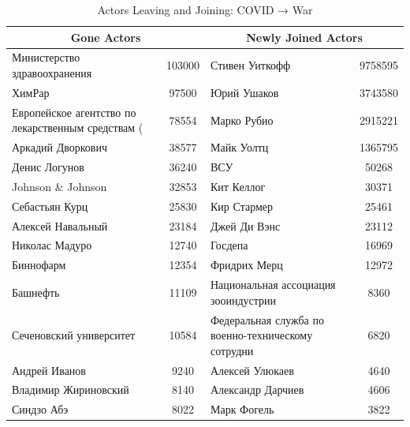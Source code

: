 \begin{table}[htbp]
\centering
\caption{Actors Leaving and Joining: COVID → War}
\label{tab:actor_changes_war}
\begin{tabular}{p{6cm}cp{6cm}c}
\toprule
\multicolumn{2}{c}{Gone Actors} & \multicolumn{2}{c}{Newly Joined Actors} \\
\midrule
Министерство здравоохранения & 103000 & Стивен Уиткофф & 9758595 \\
ХимРар & 97500 & Юрий Ушаков & 3743580 \\
Европейское агентство по лекарственным средствам ( & 78554 & Марко Рубио & 2915221 \\
Аркадий Дворкович & 38577 & Майк Уолтц & 1365795 \\
Денис Логунов & 36240 & ВСУ & 50268 \\
Johnson \& Johnson & 32853 & Кит Келлог & 30371 \\
Себастьян Курц & 25830 & Кир Стармер & 25461 \\
Алексей Навальный & 23184 & Джей Ди Вэнс & 23112 \\
Николас Мадуро & 12740 & Госдепа & 16969 \\
Биннофарм & 12354 & Фридрих Мерц & 12972 \\
Башнефть & 11109 & Национальная ассоциация зооиндустрии & 8360 \\
Сеченовский университет & 10584 & Федеральная служба по военно-техническому сотрудни & 6820 \\
Андрей Иванов & 9240 & Алексей Улюкаев & 4640 \\
Владимир Жириновский & 8140 & Александр Дарчиев & 4606 \\
Синдзо Абэ & 8022 & Марк Фогель & 3822 \\
\bottomrule
\end{tabular}
\end{table}

